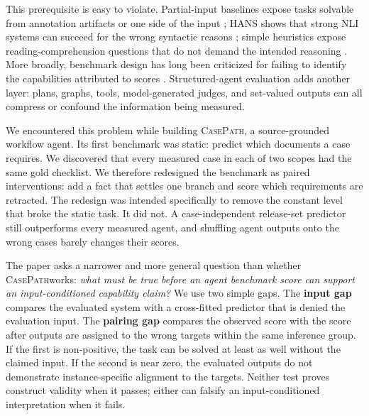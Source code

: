 \documentclass{article}
\newcommand{\casepath}{\textsc{CasePath}}
\begin{document}
This prerequisite is easy to violate. Partial-input baselines expose tasks solvable from annotation artifacts or one side of the input \citep{kaushik2018reading,poliak2018hypothesis,gururangan2018artifacts}; HANS shows that strong NLI systems can succeed for the wrong syntactic reasons \citep{mccoy2019hans}; simple heuristics expose reading-comprehension questions that do not demand the intended reasoning \citep{sugawara2018easier}. More broadly, benchmark design has long been criticized for failing to identify the capabilities attributed to scores \citep{bowman2021benchmarking,thomas2026validity,joshi2026guardians}. Structured-agent evaluation adds another layer: plans, graphs, tools, model-generated judges, and set-valued outputs can all compress or confound the information being measured.

We encountered this problem while building \casepath, a source-grounded workflow agent. Its first benchmark was static: predict which documents a case requires. We discovered that every measured case in each of two scopes had the same gold checklist. We therefore redesigned the benchmark as paired interventions: add a fact that settles one branch and score which requirements are retracted. The redesign was intended specifically to remove the constant level that broke the static task. It did not. A case-independent release-set predictor still outperforms every measured agent, and shuffling agent outputs onto the wrong cases barely changes their scores.

The paper asks a narrower and more general question than whether \casepath works: \emph{what must be true before an agent benchmark score can support an input-conditioned capability claim?} We use two simple gaps. The \textbf{input gap} compares the evaluated system with a cross-fitted predictor that is denied the evaluation input. The \textbf{pairing gap} compares the observed score with the score after outputs are assigned to the wrong targets within the same inference group. If the first is non-positive, the task can be solved at least as well without the claimed input. If the second is near zero, the evaluated outputs do not demonstrate instance-specific alignment to the targets. Neither test proves construct validity when it passes; either can falsify an input-conditioned interpretation when it fails.
\end{document}
